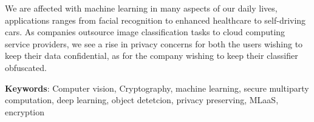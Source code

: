 We are affected with machine learning in many aspects of our daily lives, applications ranges from facial recognition to enhanced healthcare to self-driving cars. As companies outsource image classification tasks to cloud computing service providers, we see a rise in privacy concerns for both the users wishing to keep their data confidential, as for the company wishing to keep their classifier obfuscated. 

\textbf{Keywords}: Computer vision, Cryptography, machine learning, secure multiparty computation, deep learning, object detetcion, privacy preserving, MLaaS, encryption
